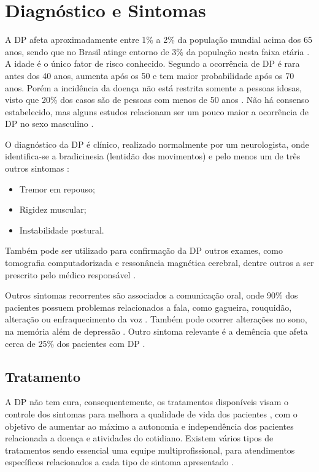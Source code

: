 \section{Diagnóstico e Sintomas}
A DP afeta aproximadamente entre 1\% a 2\% da população mundial acima dos 65 anos, sendo que no Brasil atinge entorno de 3\% da população nesta faixa etária \cite{magalhaes2009descobrindo}. A idade é o único fator de risco conhecido. Segundo  a ocorrência de DP é rara antes dos 40 anos, aumenta após os 50 e tem maior probabilidade após os 70 anos. Porém a incidência da doença não está restrita somente a pessoas idosas, visto que 20\% dos casos são de pessoas com menos de 50 anos \cite{gago2014manual}. Não há consenso estabelecido, mas alguns estudos relacionam ser um pouco maior a ocorrência de DP no sexo masculino \cite{peixinho2006alteraccoes}.

O diagnóstico da DP é clínico, realizado normalmente por um neurologista, onde identifica-se a bradicinesia (lentidão dos movimentos) e pelo menos um de três outros sintomas \cite{gago2014manual}:
\begin{itemize}
	\item Tremor em repouso;
	\item Rigidez muscular;
	\item Instabilidade postural.
\end{itemize}

Também pode ser utilizado para confirmação da DP outros exames, como tomografia computadorizada e ressonância magnética cerebral, dentre outros a ser prescrito pelo médico responsável \cite{gago2014manual}.

Outros sintomas recorrentes são associados a comunicação oral, onde 90\% dos pacientes possuem problemas relacionados a fala, como gagueira, rouquidão, alteração ou enfraquecimento da voz \cite{zarzur2010laryngeal}. Também pode ocorrer alterações no sono, na memória além de depressão \cite{barbosa2005parkinsons}. Outro sintoma relevante é a demência que afeta cerca de 25\% dos pacientes com DP \cite{pamplona1996demencia}.

\subsection{Tratamento}
A DP não tem cura, consequentemente, os tratamentos disponíveis visam o controle dos sintomas para melhora a qualidade de vida dos pacientes \cite{pamplona1996demencia}, com o objetivo de aumentar ao máximo a autonomia e independência dos pacientes relacionada a doença e atividades do cotidiano. Existem vários tipos de tratamentos sendo essencial uma equipe multiprofissional, para atendimentos específicos relacionados a cada tipo de sintoma apresentado \cite{saito2011doencca}.